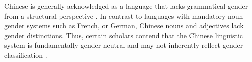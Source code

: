 \documentclass[10pt, a4paper]{article}
\newcommand{\zh}[1]{\simplifiedchinesefont{#1}\rmfamily}
\begin{document}

Chinese is generally acknowledged as a language that lacks grammatical gender from a structural perspective \citep{li_1989_mandarin}. In contrast to languages with mandatory noun gender systems such as French, or German, Chinese nouns and adjectives lack gender distinctions. Thus, certain scholars contend that the Chinese linguistic system is fundamentally gender-neutral and may not inherently reflect gender classification \citep{li_1989_mandarin,packard_2000_morphology}.
\end{document}
